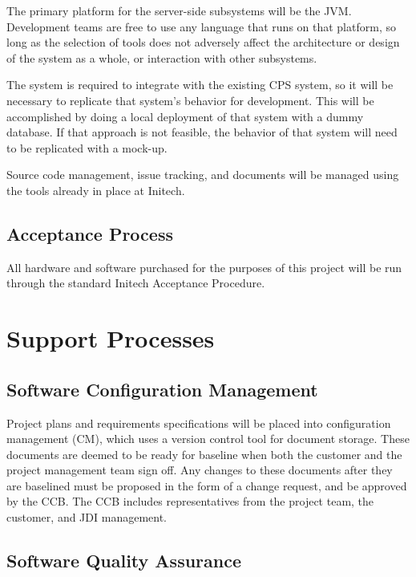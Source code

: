 \documentclass[11pt]{article}
\begin{document}
The primary platform for the server-side subsystems will be the JVM.  Development teams are free to
use any language that runs on that platform, so long as the selection of tools does not adversely
affect the architecture or design of the system as a whole, or interaction with other subsystems.

The system is required to integrate with the existing CPS system, so it will be necessary to
replicate that system's behavior for development.  This will be accomplished by doing a local
deployment of that system with a dummy database.  If that approach is not feasible, the behavior of
that system will need to be replicated with a mock-up.

Source code management, issue tracking, and documents will be managed using the tools already in
place at Initech.


\subsection{Acceptance Process}
All hardware and software purchased for the purposes of this project will be run through the
standard Initech Acceptance Procedure.



\section{Support Processes}

\subsection{Software Configuration Management}
Project plans and requirements specifications will be placed into configuration management (CM),
which uses a version control tool for document storage.  These documents are deemed to be ready for
baseline when both the customer and the project management team sign off.  Any changes to these
documents after they are baselined must be proposed in the form of a change request, and be approved
by the CCB.  The CCB includes representatives from the project team, the customer, and JDI
management.


\subsection{Software Quality Assurance}
\end{document}

